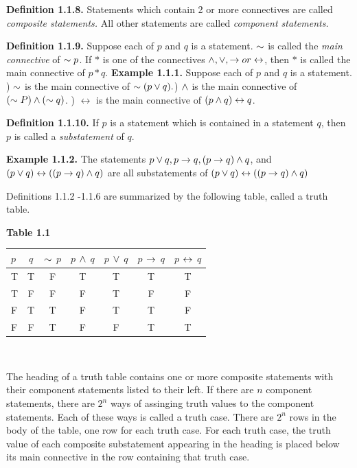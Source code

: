 \begin{large}
\fl \textbf{Definition 1.1.8.} Statements which contain 2 or more connectives are called \textit{composite statements.} All other statements are called \textit{component statements.}

\newpage

\fl \textbf{ Definition 1.1.9.} Suppose each of $p$ and $q$ is a statement. $\sim$ is called the \textit{main connective} of $\sim p$. If $*$ is one of the connectives $\wedge, \lor, \to  or \leftrightarrow$, then $*$ is called the main connective of $p* q$. \nl
\fl \textbf{ Example 1.1.1.} Suppose each of $p$ and $q$ is a statement. ) $\sim$ is the main connective of $\sim(p \lor q).$) $\wedge$ is the main connective of $( \sim P) \wedge ( \sim q)$.  ) $\leftrightarrow$  is the main connective of $(p \wedge q) \leftrightarrow q$.  \nl

\fl \textbf{Definition 1.1.10.} If $p$ is a statement which is contained in a statement $q$, then $p$ is called a \textit{substatement} of $q$. \nl

\fl \textbf{Example 1.1.2.} The statements $p \lor q, p \to q, (p \to q) \wedge q$, and $(p \lor q) \leftrightarrow ((p \to q) \wedge q)$ are all substatements of $(p \lor q) \leftrightarrow ((p \to q) \wedge q)$ \nl

\fl Definitions  1.1.2 -1.1.6 are summarized by the following table, called a truth table. \nl
$ $ \nl
\begin{center}
\textbf{Table 1.1} \nl
$ $ \nl
\begin{tabular}{ | l | c | c | c | c | c | c |}
\hline
$p$ & $q$ & $\sim$ $p$ & $p$ $\wedge$ $q$ & $p$ $\lor$ $q$ & $p$ $\to$ $q$ & $p$ $\leftrightarrow$ $q$ \\ \hline
T & T & F & T & T & T & T\\ \hline
T & F & F & F & T & F & F\\ \hline
F & T & T & F & T & T & F\\ \hline
F & F & T & F & F & T & T\\ \hline
\end{tabular} \nl
\end{center}
$ $ \nl

The heading of a truth table contains one or more composite statements with their component statements listed to their left. If there are $n$ component statements, there are $2^{n}$ ways of assinging truth values to the component statements. Each of these ways is called a truth case. There are $2^{n}$ rows in the body of the table, one row for each truth case. For each truth case, the truth value of each composite substatement appearing in the heading is placed below its main connective in the row containing that truth case. \nl


\end{large}
